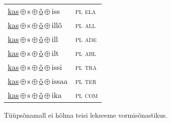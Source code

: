 \begin{minipage}{\textwidth}
\begin{sideways}
\begin{tabular}{l l}
\underline{kas}\,$\oplus$\,s\,$\oplus$\,\underline{õ}\,$\oplus$\,iss & \textsc{ pl ela } \\
\underline{kas}\,$\oplus$\,s\,$\oplus$\,\underline{õ}\,$\oplus$\,illõ & \textsc{ pl all } \\
\underline{kas}\,$\oplus$\,s\,$\oplus$\,\underline{õ}\,$\oplus$\,ill & \textsc{ pl ade } \\
\underline{kas}\,$\oplus$\,s\,$\oplus$\,\underline{õ}\,$\oplus$\,ilt & \textsc{ pl abl } \\
\underline{kas}\,$\oplus$\,s\,$\oplus$\,\underline{õ}\,$\oplus$\,issi & \textsc{ pl tra } \\
\underline{kas}\,$\oplus$\,s\,$\oplus$\,\underline{õ}\,$\oplus$\,issaa & \textsc{ pl ter } \\
\underline{kas}\,$\oplus$\,s\,$\oplus$\,\underline{õ}\,$\oplus$\,ika & \textsc{ pl com } \\
\end{tabular}
\end{sideways}
\label{tab:tüüpsõnamall-kasõ}

\end{minipage}

 
\vspace{1em}
\noindent Tüüpsõnamall  ei hõlma teisi lekseeme vormi\-sõnastikus.
